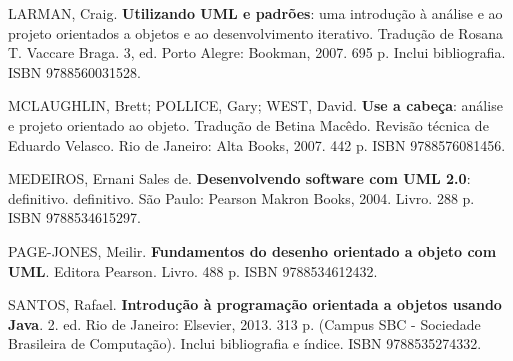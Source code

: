 \begin{pud}
\begin{bibbasica}
	\end{bibbasica}
	
	\begin{bibcomplementar}
    
        \item LARMAN, Craig. \textbf{Utilizando UML e padrões}: uma introdução à análise e ao projeto orientados a objetos e ao desenvolvimento iterativo. Tradução de Rosana T. Vaccare Braga. 3, ed. Porto Alegre: Bookman, 2007. 695 p. Inclui bibliografia. ISBN 9788560031528. 
		\item MCLAUGHLIN, Brett; POLLICE, Gary; WEST, David. \textbf{Use a cabeça}: análise  e projeto orientado ao objeto. Tradução de Betina Macêdo. Revisão técnica de Eduardo Velasco. Rio de Janeiro: Alta Books, 2007. 442 p. ISBN 9788576081456.
		\item MEDEIROS, Ernani Sales de. \textbf{Desenvolvendo software com UML 2.0}: definitivo. definitivo. São Paulo:  Pearson Makron Books, 2004. Livro. 288 p. ISBN 9788534615297.  
		\item PAGE-JONES, Meilir. \textbf{Fundamentos do desenho orientado a objeto com UML}.  Editora Pearson. Livro. 488 p. ISBN 9788534612432. 
		\item SANTOS, Rafael. \textbf{Introdução à programação orientada a objetos usando Java}. 2. ed. Rio de Janeiro: Elsevier, 2013. 313 p. (Campus SBC - Sociedade Brasileira de Computação). Inclui bibliografia e índice. ISBN 9788535274332.
	
	\end{bibcomplementar}
		
	
\end{pud}



